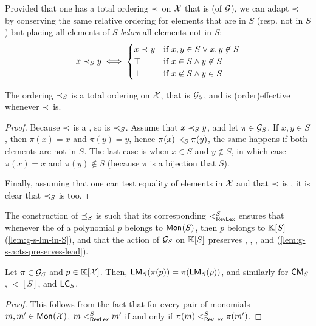 \AP
Provided that one has a total ordering $\order$ on $\X$ that is 
 (of $\group$), we can adapt $\order$
by conserving the same relative ordering for elements that are in $S$
(resp. not in $S$) but placing all elements of $S$ \emph{below} all
elements not in $S$:
\begin{equation}
    x \sOrderLt y \iff 
    \begin{cases}
        x \order y & \text{if } x,y \in S \lor x,y \not\in S  \\
        \top       & \text{if } x \in S \land y \not \in S \\
        \bot       & \text{if } x \not\in S \land y \in S \\
    \end{cases}
\end{equation}

\begin{lemma}
    \label{lem:total-ordering}
    The ordering $\sOrderLt$ is a total ordering on $\X$,
    that is  $\group_S$,
    and is \kl(order){effective} whenever $\order$ is.
\end{lemma}
\begin{proof}
    Because $\order$ is a , 
    so is $\sOrderLt$. 
    Assume that $x \sOrderLt y$, and let $\pi \in \group_S$.
    If $x,y \in S$, then $\pi(x) = x$ and $\pi(y) = y$, hence
    $\pi(x) \sOrderLt \pi(y)$, the same happens if
    both elements are not in $S$. The last case is when
    $x \in S$ and $y \not \in S$, in which case $\pi(x) = x$
    and $\pi(y) \not \in S$ (because $\pi$ is a bijection that  $S$).

    Finally,
    assuming that one can test equality of elements in $\X$ and that
    $\order$ is , it is clear that $\sOrderLt$ is 
    too.
\end{proof}

\AP The construction of $\sOrderLeq$ is such that its corresponding
 $\revlex[S]$ ensures that whenever the  of a polynomial $p$ belongs to $\mon{S}$, then $p$ belongs to
$\poly{\K}{S}$ (\cref{lem:g-s-lm-in-S}), and that the action of $\group_S$ on
$\poly{\K}{S}$ preserves , ,
, and 
(\cref{lem:g-s-acts-preserves-lead}).
%
\begin{definition}\label{def:LM T}
\end{definition}
%
\begin{lemma}
    \label{lem:g-s-acts-preserves-lead}
    Let $\pi \in \group_S$ and $p \in \poly{\K}{\X}$.
    Then, $\lm[S](\pi(p)) = \pi(\lm[S](p))$,
    and similarly for $\cm[S]$, $\lt[S]$, and $\lc[S]$.
\end{lemma}
\begin{proof}
    This follows from the fact that for every pair of monomials
    $m,m' \in \mon{\X}$,
    $m \revlex[S] m'$ if and only if $\pi(m) \revlex[S] \pi(m')$.
\end{proof}


